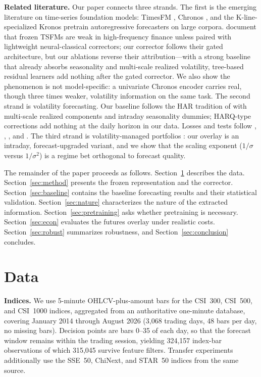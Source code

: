\documentclass[12pt]{article}
\begin{document}
\medskip
\noindent\textbf{Related literature.} Our paper connects three strands.
The first is the emerging literature on time-series foundation models:
TimesFM \citep{das2024timesfm}, Chronos \citep{ansari2024chronos}, and the
K-line-specialized Kronos \citep{shi2025kronos} pretrain autoregressive
forecasters on large corpora. \citet{dewage2026hybrid} document that frozen
TSFMs are weak in high-frequency finance unless paired with lightweight
neural-classical correctors; our corrector follows their gated architecture,
but our ablations reverse their attribution---with a strong baseline that
already absorbs seasonality and multi-scale realized volatility, tree-based
residual learners add nothing after the gated corrector. We also show the
phenomenon is not model-specific: a univariate Chronos encoder carries real,
though three times weaker, volatility information on the same task. The second
strand is volatility forecasting. Our baseline follows the HAR tradition of
\citet{corsi2009har} with multi-scale realized components and intraday
seasonality dummies; HARQ-type corrections \citep{bollerslev2016harq} add
nothing at the daily horizon in our data. Losses and tests follow
\citet{patton2011volatility}, \citet{diebold1995dm}, \citet{clark2007cw}, and
\citet{hansen2011mcs}. The third strand is volatility-managed portfolios
\citep{moreira2017volmanaged}: our overlay is an intraday, forecast-upgraded
variant, and we show that the scaling exponent ($1/\sigma$ versus
$1/\sigma^2$) is a regime bet orthogonal to forecast quality.

The remainder of the paper proceeds as follows. Section~\ref{sec:data}
describes the data. Section~\ref{sec:method} presents the frozen
representation and the corrector. Section~\ref{sec:baseline} contains the
baseline forecasting results and their statistical validation.
Section~\ref{sec:nature} characterizes the nature of the extracted
information. Section~\ref{sec:pretraining} asks whether pretraining is
necessary. Section~\ref{sec:econ} evaluates the futures overlay under
realistic costs. Section~\ref{sec:robust} summarizes robustness, and
Section~\ref{sec:conclusion} concludes.

\section{Data}\label{sec:data}
\textbf{Indices.} We use 5-minute OHLCV-plus-amount bars for the CSI~300,
CSI~500, and CSI~1000 indices, aggregated from an authoritative one-minute
database, covering January 2014 through August 2026 (3{,}068 trading days, 48
bars per day, no missing bars). Decision points are bars 0--35 of each day, so
that the forecast window remains within the trading session, yielding
324{,}157 index-bar observations of which 315{,}045 survive feature filters.
Transfer experiments additionally use the SSE~50, ChiNext, and STAR~50
indices from the same source.
\end{document}
